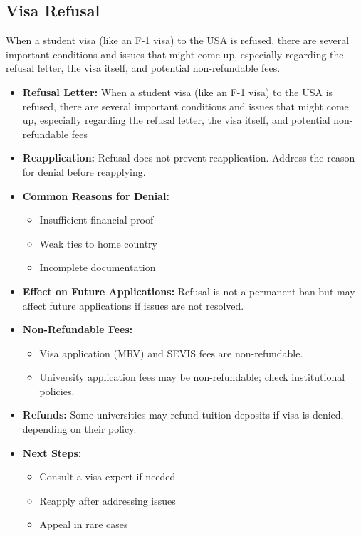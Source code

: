 \subsection{Visa Refusal}
When a student visa (like an F-1 visa) to the USA is refused, there are several important conditions and issues that might come up, especially regarding the refusal letter, the visa itself, and potential non-refundable fees.
\begin{itemize}
    \item \textbf{Refusal Letter:} When a student visa (like an F-1 visa) to the USA is refused, there are several important conditions and issues that might come up, especially regarding the refusal letter, the visa itself, and potential non-refundable fees
    \item \textbf{Reapplication:} Refusal does not prevent reapplication. Address the reason for denial before reapplying.
    \item \textbf{Common Reasons for Denial:}
    \begin{itemize}
        \item Insufficient financial proof
        \item Weak ties to home country
        \item Incomplete documentation
    \end{itemize}
    \item \textbf{Effect on Future Applications:} Refusal is not a permanent ban but may affect future applications if issues are not resolved.
    \item \textbf{Non-Refundable Fees:}
    \begin{itemize}
        \item Visa application (MRV) and SEVIS fees are non-refundable.
        \item University application fees may be non-refundable; check institutional policies.
    \end{itemize}
    \item \textbf{Refunds:} Some universities may refund tuition deposits if visa is denied, depending on their policy.
    \item \textbf{Next Steps:}
    \begin{itemize}
        \item Consult a visa expert if needed
        \item Reapply after addressing issues
        \item Appeal in rare cases
    \end{itemize}
\end{itemize}
